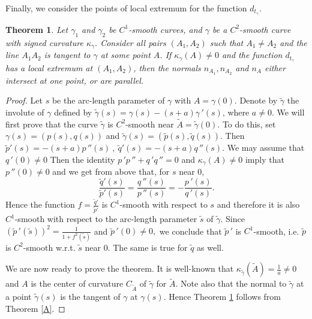 \documentclass[a4paper,12pt]{amsart}
\newtheorem{thm}{Theorem}
\def\g{\gamma}
\begin{document}
Finally, we consider the points of local extremum for the function
$d_{t_{\g}}$.

\begin{thm}\label{B} Let  $\g_1$ and $\g_2$ be $C^1$-smooth curves,
and $\g$ be a $C^2$-smooth curve with signed curvature
$\kappa_{\g}$. Consider all pairs $(A_1,A_2)$ such that
$A_1\neq A_2$ and the line $A_1A_2$ is tangent to $\g$ at some point
$A$. If $\kappa_{\g}(A)\neq 0$ and the function $d_{t_{\g}}$ has a
local extremum at $(A_1,A_2)$, then the normals
$n_{A_1},n_{A_2}$ and $n_A$ either intersect at one point, or are
parallel.
\end{thm}

\begin{proof} Let $s$ be the arc-length parameter of $\g$ with
$A=\g(0)$. Denote by $\widetilde{\g}$ the involute of $\g$ defined
by $\widetilde{\g}(s)= \g(s)-(s+a)\g\,'(s)$, where $a\neq 0$. We
will first prove that the curve $\widetilde{\g}$ is $C^2$-smooth
near $ \widetilde{A}=\widetilde{\g}(0)$. To do this, set
$\g(s)=(p(s), q(s))$ and $\widetilde{\g}(s)=(\widetilde{p}(s),
\widetilde{q}(s))$. Then $\widetilde{p}'(s)=-(s+a)p\,''(s) \  , \
\widetilde{q}'(s)=-(s+a)q\,''(s)$. We may assume that $q\,'(0)\neq 0$
Then the identity  $p\,'p\,''+q\,'q\,''=0$ and
$\kappa_{\g}(A)\neq 0$ imply that $p\,''(0)\neq 0$ and we get
from above that, for $s$ near $0,$
$$\frac{\widetilde{q}'(s)}{\widetilde{p}'(s)}=
\frac{q\,''(s)}{p\,''(s)}=-\frac{p\,'(s)}{q\,'(s)}.$$ Hence the function
$f=\displaystyle\frac{\widetilde{q}'}{\widetilde{p}'}$ is
$C^1$-smooth with respect to $s$ and therefore it is also
$C^1$-smooth with respect to the arc-length parameter $\widetilde
s$ of $\widetilde{\g}$. Since $(\widetilde p\,'(\widetilde
s))^2=\displaystyle\frac{1} {1+f^2(\widetilde s)}$ and $\widetilde
p\,'(0)\neq 0,$ we conclude that $\widetilde p\,'$ is $C^1$-smooth,
i.e. $\widetilde p$ is $C^2$-smooth w.r.t. $\tilde s$ near $0.$
The same is true for $\widetilde q$ as well.

We are now ready to prove the theorem. It is well-known that
$\kappa_{\widetilde{\g}}(\widetilde{A})=\displaystyle\frac{1}{a}\neq
0$ and $A$ is the center of curvature $C_{\widetilde{A}}$ of
$\widetilde{\g}$ for $\widetilde{A}$. Note also that the normal to
$\widetilde{\g} $ at a point $\widetilde{\g}(s)$ is the tangent of
$\g$ at $\g(s)$. Hence Theorem \ref{B} follows from Theorem \ref{A}.
\end{proof}
\end{document}
